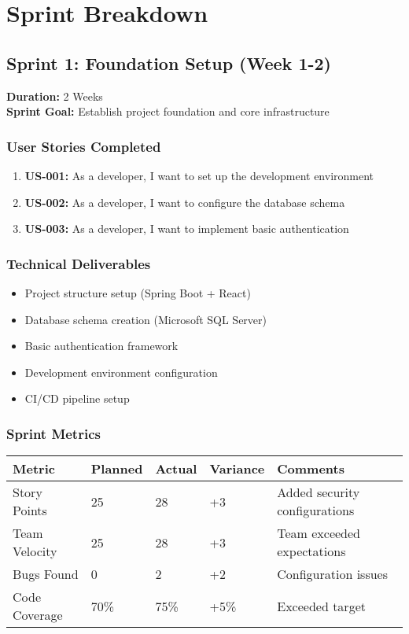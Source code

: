 \documentclass[12pt,a4paper]{article}
\begin{document}
\section{Sprint Breakdown}

\subsection{Sprint 1: Foundation Setup (Week 1-2)}
\textbf{Duration:} 2 Weeks \\
\textbf{Sprint Goal:} Establish project foundation and core infrastructure

\subsubsection{User Stories Completed}
\begin{enumerate}
    \item \textbf{US-001:} As a developer, I want to set up the development environment
    \item \textbf{US-002:} As a developer, I want to configure the database schema
    \item \textbf{US-003:} As a developer, I want to implement basic authentication
\end{enumerate}

\subsubsection{Technical Deliverables}
\begin{itemize}
    \item Project structure setup (Spring Boot + React)
    \item Database schema creation (Microsoft SQL Server)
    \item Basic authentication framework
    \item Development environment configuration
    \item CI/CD pipeline setup
\end{itemize}

\subsubsection{Sprint Metrics}
\begin{longtable}{|p{4cm}|p{2cm}|p{2cm}|p{2cm}|p{4cm}|}
\hline
\textbf{Metric} & \textbf{Planned} & \textbf{Actual} & \textbf{Variance} & \textbf{Comments} \\
\hline
Story Points & 25 & 28 & +3 & Added security configurations \\
\hline
Team Velocity & 25 & 28 & +3 & Team exceeded expectations \\
\hline
Bugs Found & 0 & 2 & +2 & Configuration issues \\
\hline
Code Coverage & 70\% & 75\% & +5\% & Exceeded target \\
\hline
\end{longtable}
\end{document}
